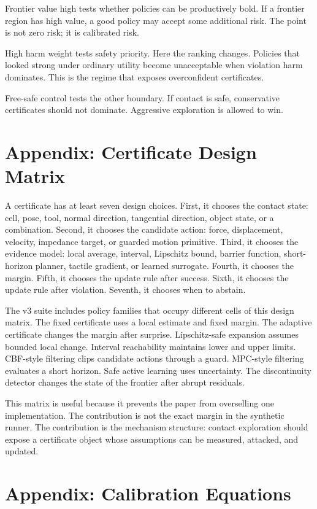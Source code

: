 \documentclass{article}
\begin{document}
Frontier value high tests whether policies can be productively bold. If a
frontier region has high value, a good policy may accept some additional risk.
The point is not zero risk; it is calibrated risk.

High harm weight tests safety priority. Here the ranking changes. Policies
that looked strong under ordinary utility become unacceptable when violation
harm dominates. This is the regime that exposes overconfident certificates.

Free-safe control tests the other boundary. If contact is safe, conservative
certificates should not dominate. Aggressive exploration is allowed to win.

\section{Appendix: Certificate Design Matrix}

A certificate has at least seven design choices. First, it chooses the contact
state: cell, pose, tool, normal direction, tangential direction, object state,
or a combination. Second, it chooses the candidate action: force,
displacement, velocity, impedance target, or guarded motion primitive. Third,
it chooses the evidence model: local average, interval, Lipschitz bound,
barrier function, short-horizon planner, tactile gradient, or learned
surrogate. Fourth, it chooses the margin. Fifth, it chooses the update rule
after success. Sixth, it chooses the update rule after violation. Seventh, it
chooses when to abstain.

The v3 suite includes policy families that occupy different cells of this
design matrix. The fixed certificate uses a local estimate and fixed margin.
The adaptive certificate changes the margin after surprise. Lipschitz-safe
expansion assumes bounded local change. Interval reachability maintains lower
and upper limits. CBF-style filtering clips candidate actions through a guard.
MPC-style filtering evaluates a short horizon. Safe active learning uses
uncertainty. The discontinuity detector changes the state of the frontier after
abrupt residuals.

This matrix is useful because it prevents the paper from overselling one
implementation. The contribution is not the exact margin in the synthetic
runner. The contribution is the mechanism structure: contact exploration
should expose a certificate object whose assumptions can be measured, attacked,
and updated.

\section{Appendix: Calibration Equations}
\end{document}
